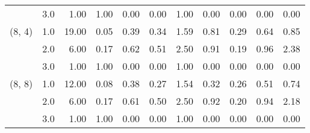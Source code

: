 \begin{tabular}{llrrrrrrrrr}
       & 3.0 &               1.00 &                     1.00 &                                 0.00 &                             0.00 &                           1.00 &                                               0.00 &                                            0.00 &                                            0.00 &                                        0.00 \\
(8, 4) & 1.0 &              19.00 &                     0.05 &                                 0.39 &                             0.34 &                           1.59 &                                               0.81 &                                            0.29 &                                            0.64 &                                        0.85 \\
       & 2.0 &               6.00 &                     0.17 &                                 0.62 &                             0.51 &                           2.50 &                                               0.91 &                                            0.19 &                                            0.96 &                                        2.38 \\
       & 3.0 &               1.00 &                     1.00 &                                 0.00 &                             0.00 &                           1.00 &                                               0.00 &                                            0.00 &                                            0.00 &                                        0.00 \\
(8, 8) & 1.0 &              12.00 &                     0.08 &                                 0.38 &                             0.27 &                           1.54 &                                               0.32 &                                            0.26 &                                            0.51 &                                        0.74 \\
       & 2.0 &               6.00 &                     0.17 &                                 0.61 &                             0.50 &                           2.50 &                                               0.92 &                                            0.20 &                                            0.94 &                                        2.18 \\
       & 3.0 &               1.00 &                     1.00 &                                 0.00 &                             0.00 &                           1.00 &                                               0.00 &                                            0.00 &                                            0.00 &                                        0.00 \\
\bottomrule
\end{tabular}
